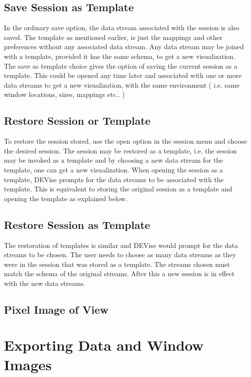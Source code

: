 \subsection{Save Session as Template}

In the ordinary save option, the data stream associated with the session is also saved. The template as mentioned earlier, is just the mappings and other preferences without any associated data stream. Any data stream may be joined with a template, provided it has the same schema, to get a new visualization. The save as template choice  gives the option of saving the current session as a template. This could be opened any time later and associated with one or more data streams to get a new  visualization, with the same environment ( i.e. same window locations, sizes, mappings etc.. ) 

\subsection{Restore Session or Template}

To restore the session stored, use the open option in the session menu and choose the desired session. The session may be restored as a template, i.e. the session may be invoked as a template and by choosing a new data stream for the template, one can get a new visualization. When opening the session as a template, DEVise prompts for the data streams to be associated with the template. This is equivalent to storing the original session as a template and opening the template as explained below.

\subsection{Restore Session as Template}

The restoration of templates is similar and DEVise would prompt  for the data streams to be chosen. The user needs to choose as many data streams as they were in the session that was stored as a template. The streams chosen must match the schema of the original streams. After this a new session is in effect with the new data streams.

\subsection{Pixel Image of View}


\section{Exporting Data and Window Images}

